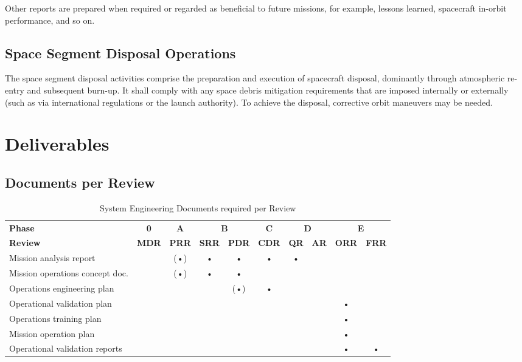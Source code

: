 Other reports are prepared when required or regarded as beneficial to future missions, for example, lessons learned, spacecraft in-orbit performance, and so on.

\subsection{Space Segment Disposal Operations}

The space segment disposal activities comprise the preparation and execution of spacecraft disposal, dominantly through atmospheric re-entry and subsequent burn-up. It shall comply with any space debris mitigation requirements that are imposed internally or externally (such as via international regulations or the launch authority). To achieve the disposal, corrective orbit maneuvers may be needed.

\section{Deliverables}

\subsection{Documents per Review}

\begin{table}[h]
\centering
\begin{tabular}{l c c c c c c c c c}
\toprule
\textbf{Phase} & \textbf{0} & \textbf{A} & \multicolumn{2}{c}{\textbf{B}} & \textbf{C} & \multicolumn{2}{c}{\textbf{D}} & \multicolumn{2}{c}{\textbf{E}} \\
\textbf{Review} & \textbf{MDR} & \textbf{PRR} & \textbf{SRR} & \textbf{PDR} & \textbf{CDR} & \textbf{QR} & \textbf{AR} & \textbf{ORR} & \textbf{FRR} \\
\midrule
Mission analysis report     	&   &(•)& • & • & • & • &   &   &   \\
\hline
Mission operations concept doc.	&   &(•)& • & • &   &   &   &   &   \\
\hline
Operations engineering plan    	&   &   &   &(•)& • &   &   &   &   \\
\hline
Operational validation plan	    &   &   &   &   &   &   &   & • &   \\
\hline
Operations training plan        &   &   &   &   &   &   &   & • &   \\
\hline
Mission operation plan			&   &   &   &   &   &   &   & • &   \\
\hline
Operational validation reports  &   &   &   &   &   &   &   & • & • \\
\bottomrule
\end{tabular}
\caption{System Engineering Documents required per Review}
\end{table}

